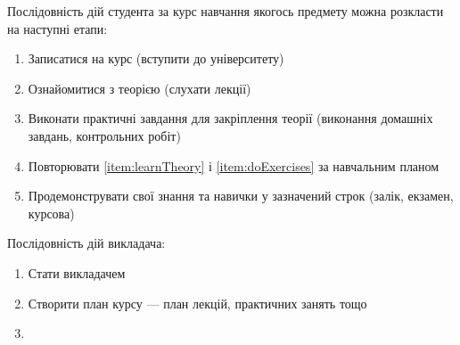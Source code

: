 Послідовність дій студента за курс навчання якогось предмету можна розкласти
на наступні етапи:
\begin{enumerate}
    \item
        Записатися на курс (вступити до університету)
    \item\label{item:learnTheory}
        Ознайомитися з теорією (слухати лекції)
    \item\label{item:doExercises}
        Виконати практичні завдання для закріплення теорії
        (виконання домашніх завдань, контрольних робіт)
    \item
        Повторювати \ref{item:learnTheory} і \ref{item:doExercises} за
        навчальним планом
    \item
        Продемонструвати свої знання та навички у зазначений строк
        (залік, екзамен, курсова)
\end{enumerate}

Послідовність дій викладача:
\begin{enumerate}
    \item
        Стати викладачем
    \item
        Створити план курсу --- план лекцій, практичних занять тощо
    \item
\end{enumerate}
